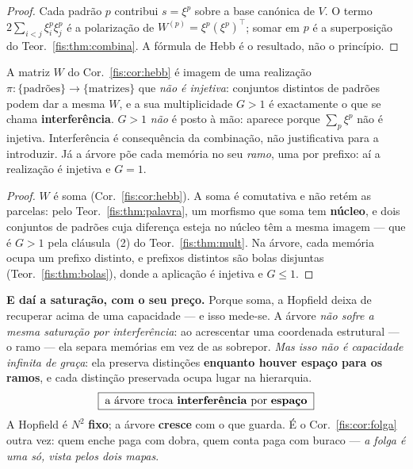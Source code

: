 \documentclass[livro.tex]{subfiles}
\begin{document}
\begin{proof}
Cada padrão $p$ contribui $s=\xi^p$ sobre a base canónica de $V$. O termo
$2\sum_{i<j}\xi_i^p\xi_j^p$ é a polarização de $W^{(p)}=\xi^p(\xi^p)^{\!\top}$;
somar em $p$ é a superposição do Teor.~\ref{fis:thm:combina}. A fórmula de
Hebb é o resultado, não o princípio.
\end{proof}

\begin{teorema}\label{fis:thm:interfere}
A matriz $W$ do Cor.~\ref{fis:cor:hebb} é imagem de uma realização
$\pi\colon\{\text{padrões}\}\to\{\text{matrizes}\}$ que \emph{não é injetiva}:
conjuntos distintos de padrões podem dar a mesma $W$, e a sua multiplicidade
$G>1$ é exactamente o que se chama \textbf{interferência}. $G>1$ \emph{não} é
posto à mão: aparece porque $\sum_p\xi^p$ não é injetiva. Interferência é
consequência da combinação, não justificativa para a introduzir. Já a árvore põe cada
memória no seu \emph{ramo}, uma por prefixo: aí a realização é injetiva e
$G=1$.
\end{teorema}

\begin{proof}
$W$ é soma (Cor.~\ref{fis:cor:hebb}). A soma é comutativa e não retém as parcelas: pelo Teor.~\ref{fis:thm:palavra}, um
morfismo que soma tem \textbf{núcleo}, e dois conjuntos de padrões cuja diferença
esteja no núcleo têm a mesma imagem --- que é $G>1$ pela cláusula~(2) do
Teor.~\ref{fis:thm:mult}. Na árvore, cada memória ocupa um prefixo distinto, e
prefixos distintos são bolas disjuntas (Teor.~\ref{fis:thm:bolas}), donde a
aplicação é injetiva e $G\le1$.
\end{proof}

\medskip\noindent\textbf{E daí a saturação, com o seu preço.} Porque soma, a
Hopfield deixa de recuperar acima de uma capacidade --- e isso mede-se. A árvore
\emph{não sofre a mesma saturação por interferência}: ao acrescentar uma
coordenada estrutural --- o ramo --- ela separa memórias em vez de as sobrepor.
\emph{Mas isso não é capacidade infinita de graça}: ela preserva distinções
\textbf{enquanto houver espaço para os ramos}, e cada distinção preservada ocupa
lugar na hierarquia.
\[
\boxed{\;\text{a árvore troca \textbf{interferência} por \textbf{espaço}}\;}
\]
A Hopfield é $N^{2}$ \textbf{fixo}; a árvore \textbf{cresce} com o que guarda. É
o Cor.~\ref{fis:cor:folga} outra vez: quem enche paga com dobra, quem conta paga
com buraco --- \emph{a folga é uma só, vista pelos dois mapas}.
\end{document}
